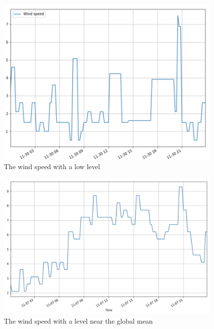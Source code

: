 \documentclass[12pt,a4paper]{report}
\begin{document}
    \begin{figure}[ht]
        \centerline{\includegraphics[scale=1]{1130}}
        \caption{The wind speed with a low level}
        \label{fig_1130}
    \end{figure}

    \begin{figure}[ht]
        \centerline{\includegraphics[scale=1]{1107}}
        \caption{The wind speed with a level near the global mean}
        \label{fig_1107}
    \end{figure}
\end{document}
